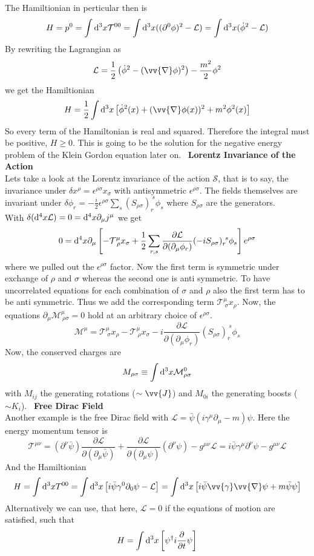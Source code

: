 \documentclass{include/thesisclass}
\newcommand{\LL}{\mathcal{L}}
\newcommand{\SSS}{\mathcal{S}}
\newcommand{\dd}{{\rm d}}
\newcommand{\p}{\partial}
\newcommand{\eps}{\epsilon}
\newcommand{\vn}{\vv{\nabla}}
\newcommand{\sub}[1]{~\newline\newline\textbf{#1}\\}
\begin{document}
The Hamiltionian in perticular then is
\[ H = p ^0 = \int \dd^3 x \mathcal{T}^{00} = \int \dd^3 x ( (\p^0 \phi)^2 - \LL ) = \int \dd^3 x ( \dot{\phi}^2 - \LL)\]
By rewriting the Lagrangian as
\[ \LL = \frac{1}{2} \left( \dot{\phi}^2 - ( \vn \phi)^2 \right) - \frac{m^2}{2} \phi^2\]
we get the Hamiltionian
\[ H = \frac{1}{2} \int \dd ^3 x \left[ \dot{\phi}^2(x) + ( \vn \phi(x))^2 + m^2 \phi^2(x) \right]\]
So every term of the Hamiltonian is real and squared. Therefore the integral must be positive, $H \geq 0$. This is going to be the solution for the negative energy problem of the Klein Gordon equation later on.
\sub{Lorentz Invariance of the Action}
Lets take a look at the Lorentz invariance of the action $\SSS$, that is to say, the invariance under $ \delta x^\rho = \eps^{\rho \sigma}x_\sigma$ with antisymmetric $\eps^{\rho\sigma}$. The fields themselves are invariant under $\delta \phi_r = - \frac{i}{2} \eps^{\rho \sigma} \sum_s (S_{\rho\sigma})_r^{~s}\phi_s$ where $S_{\rho\sigma}$ are the generators.\\
With $\delta(\dd^4 x \LL) = 0 = \dd^4 x \p_\mu j^\mu$ we get
\[ 0 = \dd^4 x \p_\mu \left[ - \mathcal{T}^\mu_{~\rho} x_\sigma + \frac{1}{2} \sum_{r,s} \frac{\p \LL}{\p( \p_\mu \phi_r)} (-i S_{\rho \sigma})_r^{~s}\phi_s\right] e^{\rho \sigma}\]
where we pulled out the $\eps^{\rho\sigma}$ factor. Now the first term is symmetric under exchange of $\rho$ and $\sigma$ whereas the second one is anti symmetric. To have uncorrelated equations for each combination of $\sigma$ and $\rho$ also the first term has to be anti symmetric. Thus we add the corresponding term $\mathcal{T}^{\mu}_{~\sigma}x_\rho$. Now, the equations $\p_\mu \mathcal{M}^\mu_{~\rho\sigma} =0$ hold at an arbitrary choice of $\eps^{\rho\sigma}$.
\[\mathcal{M}^\mu = \mathcal{T}^\mu_{~\sigma} x_\rho - \mathcal{T}^\mu_{~\rho}x_\sigma - i \frac{\p \LL}{\p ( \p _\mu \phi_r)} ( S_{\rho\sigma})_r^{~s}\phi_s\]
Now, the conserved charges are
\[ M_{\rho \sigma} \equiv \int \dd^3 x \mathcal{M}^0_{\rho\sigma}\]
with $M_{ij}$ the generating rotations ($\sim \vv{J}$) and $M_{0i}$ the generating boosts ($\sim K_i$).
\sub{Free Dirac Field}
Another example is the free Dirac field with $\LL = \bar{\psi}( i \gamma^\mu \p_ \mu - m ) \psi$. Here the energy momentum tensor is
\[ \mathcal{T}^{\mu \nu} = (\p^\nu \bar{\psi}) \frac{\p \LL}{\p ( \p_\mu \bar{\psi})} + \frac{\p \LL}{\p ( \p_\mu \psi)} ( \p^\nu \psi) - g^{\mu\nu} \LL = i \bar{\psi} \gamma^\mu \p ^\nu \psi - g^{\mu\nu} \LL\]
And the Hamiltionian
\[ H = \int \dd^3 x T^{00} = \int \dd^3 x \left[ i \bar{\psi} \gamma^0 \p_0 \psi - \LL\right] = \int \dd^3 x \left[ i \bar{\psi}\vv{\gamma} \vn \psi + m \bar{\psi} \psi \right]\]
Alternatively we can use, that here, $\LL = 0$ if the equations of motion are satisfied, such that 
\[ H = \int \dd^3 x \left[ \psi^\dagger i \frac{\p}{\p t} \psi \right]\]
\end{document}
